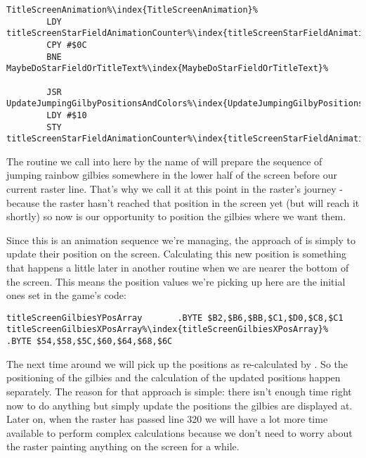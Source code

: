 \begin{lstlisting}[escapechar=\%]
TitleScreenAnimation%\index{TitleScreenAnimation}%
        LDY titleScreenStarFieldAnimationCounter%\index{titleScreenStarFieldAnimationCounter}%
        CPY #$0C
        BNE MaybeDoStarFieldOrTitleText%\index{MaybeDoStarFieldOrTitleText}%

        JSR UpdateJumpingGilbyPositionsAndColors%\index{UpdateJumpingGilbyPositionsAndColors}%
        LDY #$10
        STY titleScreenStarFieldAnimationCounter%\index{titleScreenStarFieldAnimationCounter}%
\end{lstlisting}

The routine we call into here by the name of  will prepare the sequence
of jumping rainbow gilbies somewhere in the lower half of the screen before our current raster line. That's why we
call it at this point in the raster's journey - because the raster hasn't reached that position in the screen yet
(but will reach it shortly) so now is our opportunity to position the gilbies where we want them. 

Since this is an animation sequence we're managing, the approach of  is
simply to update their position on the screen. Calculating this new position is something that happens a little later
in another routine  when we are nearer the bottom of the screen. This means the
position values we're picking up here are the initial ones set in the game's code:

\begin{lstlisting}[escapechar=\%]
titleScreenGilbiesYPosArray       .BYTE $B2,$B6,$BB,$C1,$D0,$C8,$C1
titleScreenGilbiesXPosArray%\index{titleScreenGilbiesXPosArray}%       .BYTE $54,$58,$5C,$60,$64,$68,$6C
\end{lstlisting}

The next time around we will pick up the positions as re-calculated by .
So the positioning of the gilbies and the calculation of the updated positions happen separately. The reason
for that approach is simple: there isn't enough time right now to do anything but simply update the positions the gilbies
are displayed at.
Later on, when the raster has passed line 320 we will have a lot more time available to perform complex calculations
because we don't need to worry about the raster painting anything on the screen for a while.

